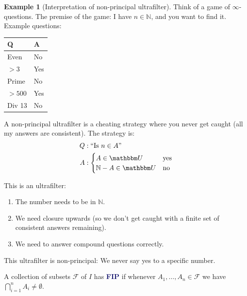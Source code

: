 \documentclass[11pt]{article}
\numberwithin{equation}{section}
\newcommand{\navy}[1]{\textcolor{MidnightBlue}{\bf #1}}
\newcounter{theo}[section]\setcounter{theo}{0}
\theoremstyle{definition}
\theoremstyle{definition}
\newtheorem{example}{\color{WildStrawberry}Example}[section]
\newcommand{\1}{\mathbbm 1}
\newcommand{\NN}{\mathbb N}
\newcommand{\UU}{\mathbbm U}
\newcommand{\fF}{\mathcal F}
\begin{document}
\begin{example}[Interpretation of non-principal ultrafilter]
	Think of a game of $\infty$-questions. The premise of the game: I have $n \in \NN$, and you want to find it. Example questions:
	\begin{center}
		\begin{tabular}{l|l}
			Q & A \\
			\hline 
			Even & No \\
			$> 3$ & Yes \\
			Prime & No \\
			$> 500$ & Yes \\
			Div 13 & No
		\end{tabular}
	\end{center}
	A non-principal ultrafilter is a cheating strategy where you never get caught (all my answers are consistent). The strategy is: 
	\begin{align*}
		Q &: \text{``Is $n \in A$''} \\
		A &:
		\begin{cases}
			A \in \UU & \text{yes} \\
			\NN - A \in \UU & \text{no}
		\end{cases}
	\end{align*}

	This is an ultrafilter:
	\begin{enumerate}
		\item The number needs to be in $\NN$. 
		\item We need closure upwards (so we don't get caught with a finite set of consistent answers remaining).
		\item We need to answer compound questions correctly. 
	\end{enumerate}

	This ultrafilter is non-principal: We never say yes to a specific number. 
\end{example}

\begin{definition}
	A collection of subsets $\fF$ of $I$ has \navy{FIP} if whenever $A_1,\ldots,A_n \in \fF$ we have $\bigcap_{i=1}^n A_i \neq \emptyset$. 
\end{definition}
\end{document}
